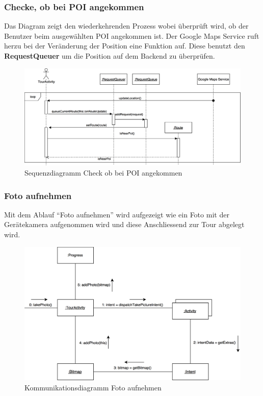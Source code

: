 \documentclass[a4paper,10pt,xetex]{article}
\begin{document}
\subsubsection{Checke, ob bei POI angekommen}
Das Diagram zeigt den wiederkehrenden Prozess wobei überprüft wird, ob der Benutzer beim
ausgewählten POI angekommen ist. Der Google Maps Service ruft herzu bei der Veränderung
der Position eine Funktion auf. Diese benutzt den \textbf{RequestQueuer} um die Position
auf dem Backend zu überprüfen.

\begin{figure}
  \includegraphics{Sequenzdiagramm_IsNearPoi}
  \caption{Sequenzdiagramm Check ob bei POI angekommen}
\end{figure}

\subsubsection{Foto aufnehmen}
Mit dem Ablauf ``Foto aufnehmen'' wird aufgezeigt wie ein Foto mit der Gerätekamera
aufgenommen wird und diese Anschliessend zur Tour abgelegt wird.

\begin{figure}
  \includegraphics{Kommunikationsdiagramm_TakePhoto}
  \caption{Kommunikationsdiagramm Foto aufnehmen}
\end{figure}
\end{document}
